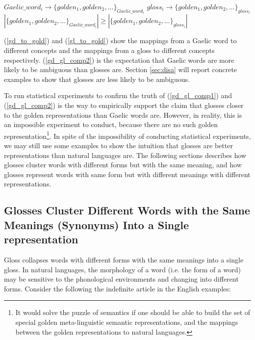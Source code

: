 \documentclass[final]{ua-thesis}
\begin{document}
\begin{exe}
\ex
	\begin{xlist}
	\ex \label{gd_to_gold} $Gaelic\_word_i \rightarrow \{golden_1, golden_2, \ldots\}_{Gaelic\_word_i}$
	\ex \label{gl_to_gold} $gloss_i \rightarrow \{golden_1, golden_2, \ldots\}_{gloss_i}$
	\ex\label{gd_gl_comp2}$ |\{golden_1, golden_2, \ldots\}_{Gaelic\_word_i}| \geq |\{golden_1, golden_2, \ldots\}_{gloss_i}|$
	\end{xlist}
\end{exe}

(\ref{gd_to_gold}) and (\ref{gl_to_gold}) show the mappings from a Gaelic word to different concepts and the mappings from a gloss to different concepts respectively. 
(\ref{gd_gl_comp2}) is the expectation that Gaelic words are more likely to be ambiguous than glosses are. Section \ref{sec:disa} will report concrete examples to show that glosses are less likely to be ambiguous.

To run statistical experiments to confirm the truth of (\ref{gd_gl_comp1}) and (\ref{gd_gl_comp2}) is the way to empirically support the claim that glosses closer to the golden representations than Gaelic words are. 
However, in reality, this is an impossible experiment to conduct, because there are no such golden representation\footnote{It would solve the puzzle of semantics if one should be able to build the set of special golden meta-linguistic semantic representations, and the mappings between the golden representations to natural languages.}.
In spite of the impossibility of conducting statistical experiments, we may still use some examples to show the intuition that glosses are better representations than natural languages are. The following sections describes how glosses cluster words with different forms but with the same meaning, and how glosses represent words with same form but with different meanings with different representations. 

\subsection{Glosses Cluster Different Words with the Same Meanings (Synonyms) Into a Single representation}\label{sec:cluster}
Gloss collapses words with different forms with the same meanings into a single gloss. In natural languages, the morphology of a word (i.e. the form of a word) may be sensitive to the phonological environments and changing into different forms. Consider the following the indefinite article in the English examples: 
\end{document}
